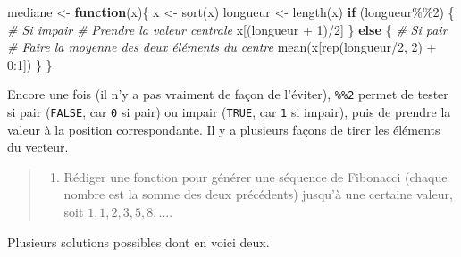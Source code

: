 \documentclass[
]{book}
\newenvironment{Shaded}{}{}
\newcommand{\CommentTok}[1]{\textit{#1}}
\newcommand{\ControlFlowTok}[1]{\textbf{#1}}
\newcommand{\DecValTok}[1]{#1}
\newcommand{\FunctionTok}[1]{#1}
\newcommand{\NormalTok}[1]{#1}
\newcommand{\OtherTok}[1]{#1}
\newcommand{\SpecialCharTok}[1]{#1}
\providecommand{\tightlist}{%
  \setlength{\itemsep}{0pt}\setlength{\parskip}{0pt}}
\begin{document}
\begin{Shaded}
\begin{Highlighting}[]
\NormalTok{mediane }\OtherTok{\textless{}{-}} \ControlFlowTok{function}\NormalTok{(x)\{}
\NormalTok{  x }\OtherTok{\textless{}{-}} \FunctionTok{sort}\NormalTok{(x)}
\NormalTok{  longueur }\OtherTok{\textless{}{-}} \FunctionTok{length}\NormalTok{(x)}
  \ControlFlowTok{if}\NormalTok{ (longueur}\SpecialCharTok{\%\%}\DecValTok{2}\NormalTok{) \{}
    \CommentTok{\# Si impair}
    \CommentTok{\# Prendre la valeur centrale}
\NormalTok{    x[(longueur }\SpecialCharTok{+} \DecValTok{1}\NormalTok{)}\SpecialCharTok{/}\DecValTok{2}\NormalTok{]}
\NormalTok{  \} }\ControlFlowTok{else}\NormalTok{ \{}
    \CommentTok{\# Si pair}
    \CommentTok{\# Faire la moyenne des deux éléments du centre}
    \FunctionTok{mean}\NormalTok{(x[}\FunctionTok{rep}\NormalTok{(longueur}\SpecialCharTok{/}\DecValTok{2}\NormalTok{, }\DecValTok{2}\NormalTok{) }\SpecialCharTok{+} \DecValTok{0}\SpecialCharTok{:}\DecValTok{1}\NormalTok{])}
\NormalTok{  \}}
\NormalTok{\}}
\end{Highlighting}
\end{Shaded}

Encore une fois (il n'y a pas vraiment de façon de l'éviter), \texttt{\%\%2} permet de tester si pair (\texttt{FALSE}, car \texttt{0} si pair) ou impair (\texttt{TRUE}, car \texttt{1} si impair), puis de prendre la valeur à la position correspondante. Il y a plusieurs façons de tirer les éléments du vecteur.

\begin{quote}
\begin{enumerate}
\def\labelenumi{\arabic{enumi}.}
\setcounter{enumi}{4}
\tightlist
\item
  Rédiger une fonction pour générer une séquence de Fibonacci (chaque nombre est la somme des deux précédents) jusqu'à une certaine valeur, soit \(1,1,2,3,5,8,...\).
\end{enumerate}
\end{quote}

Plusieurs solutions possibles dont en voici deux.
\end{document}
